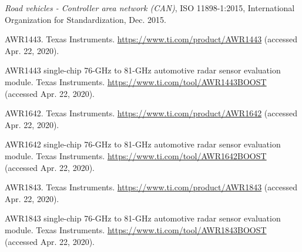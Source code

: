\documentclass[11pt]{IEEEtran}
\begin{document}
\begin{thebibliography}{00}
				 \textit{Road vehicles - Controller area network (CAN)}, ISO 11898-1:2015, International Organization for Standardization, Dec. 2015.

				 AWR1443. Texas Instruments. \url{https://www.ti.com/product/AWR1443} (accessed Apr. 22, 2020).

				 AWR1443 single-chip 76-GHz to 81-GHz automotive radar sensor evaluation module. Texas Instruments. \url{https://www.ti.com/tool/AWR1443BOOST} (accessed Apr. 22, 2020).

				 AWR1642. Texas Instruments. \url{https://www.ti.com/product/AWR1642} (accessed Apr. 22, 2020).

				 AWR1642 single-chip 76-GHz to 81-GHz automotive radar sensor evaluation module. Texas Instruments. \url{https://www.ti.com/tool/AWR1642BOOST} (accessed Apr. 22, 2020).

				 AWR1843. Texas Instruments. \url{https://www.ti.com/product/AWR1843} (accessed Apr. 22, 2020).

				 AWR1843 single-chip 76-GHz to 81-GHz automotive radar sensor evaluation module. Texas Instruments. \url{https://www.ti.com/tool/AWR1843BOOST} (accessed Apr. 22, 2020).
		
	\end{thebibliography}
\end{document}
